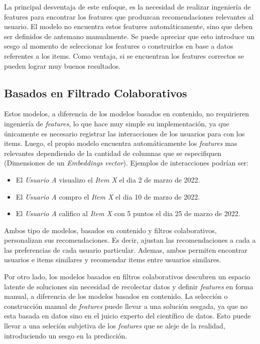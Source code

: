 \documentclass[11pt,a4paper,twoside]{thesis}
\begin{document}
La principal desventaja de este enfoque, es la necesidad de realizar ingeniería
de features para encontrar los features que produzcan recomendaciones
relevantes al usuario. El modelo no encuentra estos features automáticamente,
sino que deben ser definidos de antemano manualmente. Se puede apreciar que
esto introduce un sesgo al momento de seleccionar los features o construirlos
en base a datos referentes a los items. Como ventaja, si se encuentran los
features correctos se pueden lograr muy buenos resultados.

\subsection{Basados en Filtrado Colaborativos}

Estos modelos, a diferencia de los modelos basados en contenido, no requirieren
ingeniería de \textit{features}, lo que hace muy simple su implementación, ya
que únicamente es necesario registrar las interacciones de los usuarios para
con los items. Luego, el propio modelo encuentra automáticamente los
\textit{features} mas relevantes dependiendo de la cantidad de columnas que se
especifiquen (Dimensiones de un \textit{Embeddings vector}). Ejemplos de
interacciones podrían ser:

\begin{itemize}
	\item El \textit{Usuario A} visualizo el \textit{Item X} el dia 2 de marzo de 2022.
	\item El \textit{Usuario A} compro el \textit{Item X} el dia 10 de marzo de 2022.
	\item El \textit{Usuario A} califico al \textit{Item X} con 5 puntos el dia 25 de
	      marzo de 2022.
\end{itemize}

Ambos tipo de modelos, basados en contenido y filtros colaborativos,
personalizan sus recomendaciones. Es decir, ajustan las recomendaciones a cada
a las preferencias de cada usuario particular. Ademas, ambos permiten encontrar
usuarios e items similares y recomendar items entre usuarios similares.

Por otro lado, los modelos basados en filtros colaborativos descubren un
espacio latente de soluciones sin necesidad de recolectar datos y definir
\textit{features} en forma manual, a diferencia de los modelos basados en
contenido. La selección o construcción manual de \textit{features} puede llevar
a una solución sesgada, ya que no esta basada en datos sino en el juicio
experto del científico de datos. Esto puede llevar a una seleción subjetiva de
los \textit{features} que se aleje de la realidad, introduciendo un sesgo en la
predicción.
\end{document}
